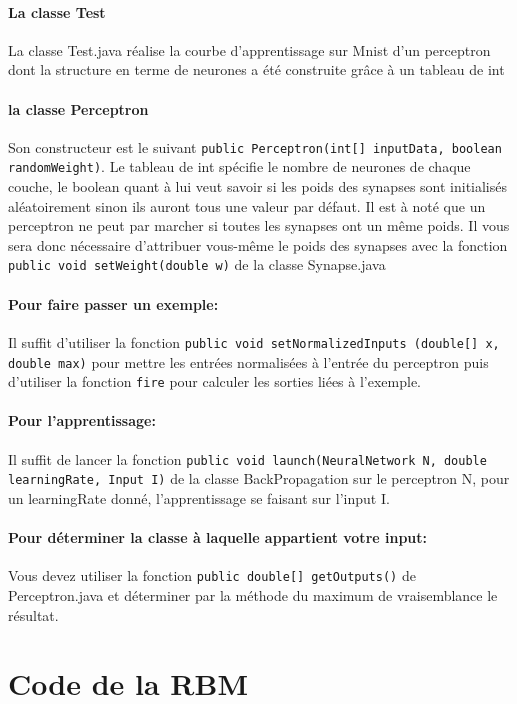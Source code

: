 \documentclass[a4paper,oneside]{report}
\begin{document}
\paragraph*{La classe Test} La classe Test.java réalise la courbe d'apprentissage sur Mnist d'un perceptron dont la structure en terme de neurones a été construite grâce à un tableau de int

\paragraph*{la classe Perceptron} Son constructeur est le suivant \texttt{public Perceptron(int[] inputData, boolean randomWeight)}. Le tableau de int spécifie le nombre de neurones de chaque couche, le boolean quant à lui veut savoir si les poids des synapses sont initialisés aléatoirement sinon ils auront tous une valeur par défaut. Il est à noté que un perceptron ne peut par marcher si toutes les synapses ont un même poids. Il vous sera donc nécessaire d'attribuer vous-même le poids des synapses avec la fonction \texttt{public void setWeight(double w)} de la classe Synapse.java

\paragraph*{Pour faire passer un exemple:} Il suffit d'utiliser la fonction \texttt{public void setNormalizedInputs (double[] x, double max)} pour mettre les entrées normalisées à l'entrée du perceptron puis d'utiliser la fonction \texttt{fire} pour calculer les sorties liées à l'exemple.

\paragraph*{Pour l'apprentissage: } Il suffit de lancer la fonction \texttt{public void launch(NeuralNetwork N, double learningRate, Input I)} de la classe BackPropagation sur le perceptron N, pour un learningRate donné, l'apprentissage se faisant sur l'input I.  

\paragraph*{Pour déterminer la classe à laquelle appartient votre input:} Vous devez utiliser la fonction \texttt{public double[] getOutputs()} de Perceptron.java et déterminer par la méthode du maximum de vraisemblance le résultat.

\section{Code de la RBM}
\end{document}

